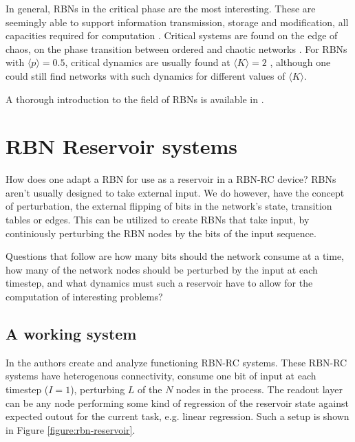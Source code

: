In general, RBNs in the critical phase are the most interesting.
These are seemingly able to support information transmission, storage and modification,
all capacities required for computation \cite{langton3computation}.
Critical systems are found on the edge of chaos,
on the phase transition between ordered and chaotic networks \cite{gershenson2004introduction}.
For RBNs with $\langle p \rangle = 0.5$,
critical dynamics are usually found at $\langle K \rangle = 2$ \cite{gershenson2004introduction},
although one could still find networks with such dynamics for different values of $\langle K \rangle$.

A thorough introduction to the field of RBNs is available in \cite{gershenson2004introduction}.

\section{RBN Reservoir systems}
\label{subsection:rbn-reservoir-systems}

How does one adapt a RBN for use as a reservoir in a RBN-RC device?
RBNs aren't usually designed to take external input.
We do however, have the concept of perturbation,
the external flipping of bits in the network's state,
transition tables or edges.
This can be utilized to create RBNs that take input,
by continiously perturbing the RBN nodes by the bits of the input sequence.

Questions that follow are how many bits should the network consume at a time,
how many of the network nodes should be perturbed by the input at each timestep,
and what dynamics must such a reservoir have to allow for the computation of interesting problems?

\subsection{A working system}

In \cite{rbn-reservoir} the authors create and analyze functioning RBN-RC systems.
These RBN-RC systems have heterogenous connectivity,
consume one bit of input at each timestep ($I=1$),
perturbing $L$ of the $N$ nodes in the process.
The readout layer can be any node performing some kind of regression of the reservoir state against expected outout for the current task, e.g. linear regression.
Such a setup is shown in Figure \ref{figure:rbn-reservoir}.

